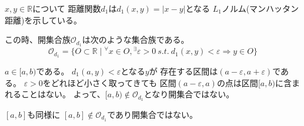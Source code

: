 \documentclass[12pt,b5paper]{ltjsarticle}
\begin{document}
\begin{enumerate}
\dotfill

      $x,y\in\mathbb{R}$について
      距離関数$d_{1}$は$d_{1}(x,y)=\lvert x-y \rvert$となる
      $L_{1}$ノルム(マンハッタン距離)を示している。

      この時、開集合族$\mathcal{O}_{d_{1}}$は次のような集合族である。
      \begin{equation}
       \mathcal{O}_{d_{1}}=
        \{ O \subset \mathbb{R} \mid
        {}^{\forall}x\in O, {}^{\exists}\varepsilon>0 \
        s.t. \ d_{1}(x,y)<\varepsilon \Rightarrow y\in O \}
      \end{equation}

      $a\in [a,b)$である。
      $d_{1}(a,y)<\varepsilon$となる$y$が
      存在する区間は$(a-\varepsilon , a+\varepsilon)$である。
      $\varepsilon>0$をどれほど小さく取ってきても
      区間$(a-\varepsilon , a)$の点は区間$[a,b)$に含まれることはない。
      よって、$[a,b) \not\in\mathcal{O}_{d_{1}}$となり開集合ではない。

      $[a,b]$も同様に
      $[a,b] \not\in\mathcal{O}_{d_{1}}$であり開集合ではない。

\hrulefill

\end{enumerate}
\end{document}
